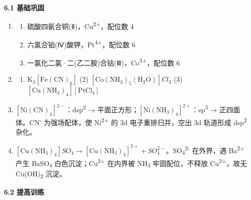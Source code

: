 \textbf{6.1 基础巩固}

\begin{enumerate}
\def\labelenumi{\arabic{enumi}.}
\item
  \begin{enumerate}
  \def\labelenumii{(\arabic{enumii})}
  \tightlist
  \item
    硫酸四氨合铜(Ⅱ)，Cu\textsuperscript{2+}，配位数 4
  \item
    六氯合铂(Ⅳ)酸钾，Pt\textsuperscript{4+}，配位数 6
  \item
    一氯化二氯·二(乙二胺)合钴(Ⅲ)，Co\textsuperscript{3+}，配位数 6
  \end{enumerate}
\item
  \begin{enumerate}
  \def\labelenumii{(\arabic{enumii})}
  \tightlist
  \item
    \(\mathrm{K_3[Fe(CN)_6]}\) (2) \([\mathrm{Co(NH_3)_5(H_2O)}]Cl_3\) (3) \([\mathrm{Cu(NH_3)_4}][\mathrm{PtCl_4}]\)
  \end{enumerate}
\item
  \([\mathrm{Ni(CN)_4}]^{2-}\)：dsp\textsuperscript{2} → 平面正方形；\([\mathrm{Ni(NH_3)_4}]^{2+}\)：sp\textsuperscript{3} → 正四面体。CN\textsuperscript{-} 为强场配体，使 Ni\textsuperscript{2+} 的 3d 电子重排归并，空出 3d 轨道形成 dsp\textsuperscript{2} 杂化。
\item
  \([\mathrm{Cu(NH_3)_4}]SO_4 \rightarrow [\mathrm{Cu(NH_3)_4}]^{2+} + SO_4^{2-}\)。SO\textsubscript{4}\textsuperscript{2-} 在外界，遇 Ba\textsuperscript{2+} 产生 BaSO\textsubscript{4} 白色沉淀；Cu\textsuperscript{2+} 在内界被 NH\textsubscript{3} 牢固配位，不释放 Cu\textsuperscript{2+}，故无 Cu(OH)\textsubscript{2} 沉淀。
\end{enumerate}

\textbf{6.2 提高训练}

